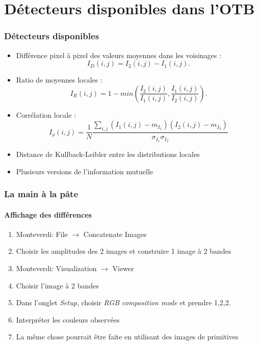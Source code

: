 \documentclass[compress]{beamer}
\begin{document}
\section[Détecteurs]{Détecteurs disponibles dans l'OTB}
\begin{frame}
  \frametitle{Détecteurs disponibles}
  \small
  \begin{itemize}
    \item Différence pixel à pixel des valeurs moyennes dans les
      voisinages :
      \begin{equation}
	I_{D}(i,j)=I_{2}(i,j)-I_{1}(i,j).
      \end{equation}
    \item Ratio de moyennes locales :
      \begin{equation}
\displaystyle I_{R}(i,j) = 1 - min \left(\frac{\displaystyle I_{2}(i,j)}{\displaystyle I_{1}(i,j)},\frac{\displaystyle I_{1}(i,j)}{\displaystyle I_{2}(i,j)}\right).
\end{equation}
      \item Corrélation locale :
\begin{equation}
  I_\rho(i,j) = \frac{1}{N}\frac{\sum_{i,j}(I_1(i,j)-m_{I_1})(I_2(i,j)-m_{I_2})}{\sigma_{I_1}
\sigma_{I_2}}
\end{equation}
\item Distance de Kullback-Leibler entre les distributions locales
  \item Plusieurs versions de l'information mutuelle
  \end{itemize}
  \normalsize
\end{frame}

\begin{frame}
  \frametitle{La main à la pâte}
  \framesubtitle{Affichage des différences}
  \begin{enumerate}
  \item Monteverdi: File $\rightarrow$ Concatenate Images
  \item Choisir les amplitudes des 2 images et construire 1 image à 2 bandes
  \item Monteverdi: Visualization $\rightarrow$ Viewer
  \item Choisir l'image à 2 bandes
  \item Dans l'onglet {\em Setup}, choisir {\em RGB composition mode}
    et prendre 1,2,2.
  \item Interpréter les couleurs observées
  \item La même chose pourrait être faite en utilisant des images de primitives
  \end{enumerate}
\end{frame}
\end{document}
